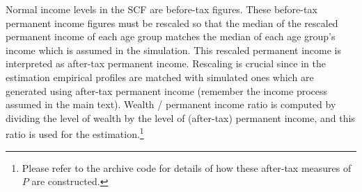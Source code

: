 \documentclass[titlepage, headings=optiontotocandhead]{econark}
\newcommand{\texname}{SolvingMicroDSOPs} %
\begin{document}
Normal income levels in the SCF are before-tax figures. These before-tax permanent income figures must be rescaled so that the median of the rescaled permanent income of each age group matches the median of each age group's income which is assumed in the simulation. This rescaled permanent income is interpreted as after-tax permanent income. Rescaling is crucial since in the estimation empirical profiles are matched with simulated ones which are generated using after-tax permanent income (remember the income process assumed in the main text). Wealth / permanent income ratio is computed by dividing the level of wealth by the level of (after-tax) permanent income, and this ratio is used for the estimation.\footnote{Please refer to the archive code for details of how these after-tax measures of $P$ are constructed.}


\vfill\clearpage


\econarkmultibib{\texname}


\end{document}
